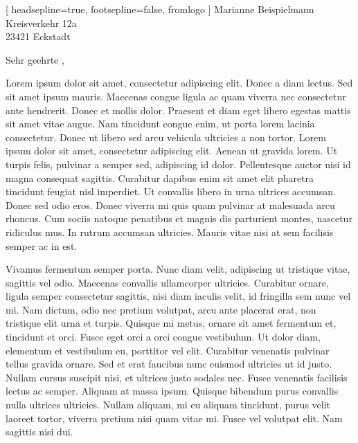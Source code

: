 \documentclass[version=last, fontsize=12pt]{scrlttr2}   %
\begin{document}



\begin{letter}[%
    headsepline=true,%
    footsepline=false,%
    fromlogo%
]{%
    Marianne Beispielmann\\
    Kreisverkehr 12a\\
    23421 Eckstadt%
}

\opening{Sehr geehrte ,}

Lorem ipsum dolor sit amet, consectetur adipiscing elit. Donec a diam lectus. Sed sit amet ipsum mauris. Maecenas congue ligula ac quam viverra nec consectetur ante hendrerit. Donec et mollis dolor. Praesent et diam eget libero egestas mattis sit amet vitae augue. Nam tincidunt congue enim, ut porta lorem lacinia consectetur. Donec ut libero sed arcu vehicula ultricies a non tortor. Lorem ipsum dolor sit amet, consectetur adipiscing elit. Aenean ut gravida lorem. Ut turpis felis, pulvinar a semper sed, adipiscing id dolor. Pellentesque auctor nisi id magna consequat sagittis. Curabitur dapibus enim sit amet elit pharetra tincidunt feugiat nisl imperdiet. Ut convallis libero in urna ultrices accumsan. Donec sed odio eros. Donec viverra mi quis quam pulvinar at malesuada arcu rhoncus. Cum sociis natoque penatibus et magnis dis parturient montes, nascetur ridiculus mus. In rutrum accumsan ultricies. Mauris vitae nisi at sem facilisis semper ac in est.

Vivamus fermentum semper porta. Nunc diam velit, adipiscing ut tristique vitae, sagittis vel odio. Maecenas convallis ullamcorper ultricies. Curabitur ornare, ligula semper consectetur sagittis, nisi diam iaculis velit, id fringilla sem nunc vel mi. Nam dictum, odio nec pretium volutpat, arcu ante placerat erat, non tristique elit urna et turpis. Quisque mi metus, ornare sit amet fermentum et, tincidunt et orci. Fusce eget orci a orci congue vestibulum. Ut dolor diam, elementum et vestibulum eu, porttitor vel elit. Curabitur venenatis pulvinar tellus gravida ornare. Sed et erat faucibus nunc euismod ultricies ut id justo. Nullam cursus suscipit nisi, et ultrices justo sodales nec. Fusce venenatis facilisis lectus ac semper. Aliquam at massa ipsum. Quisque bibendum purus convallis nulla ultrices ultricies. Nullam aliquam, mi eu aliquam tincidunt, purus velit laoreet tortor, viverra pretium nisi quam vitae mi. Fusce vel volutpat elit. Nam sagittis nisi dui.


\end{letter}
\end{document}
